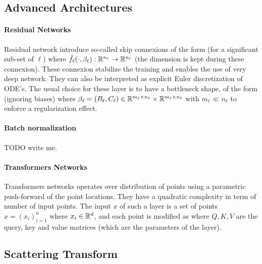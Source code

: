 \subsection{Advanced Architectures}
\label{sec-advanced}


\paragraph{Residual Networks}

Residual network introduce so-called skip connexions of the form (for a significant sub-set of $\ell$)
where $\tilde f_\ell(\cdot,\beta_\ell) : \mathbb{R}^{n_\ell} \rightarrow \mathbb{R}^{n_\ell}$ (the dimension is kept during these connexion). These connexion stabilize the training and enables the use of very deep network. They can also be interpreted as explicit Euler discretization of ODE's.
%
The usual choice for these layer is to have a bottleneck shape, of the form 
(ignoring biases) where $\beta_\ell = (B_\ell, C_\ell) \in \mathbb{R}^{m_\ell \times n_\ell} \times \mathbb{R}^{m_\ell \times n_\ell}$ with $m_\ell \ll n_\ell$ to enforce a regularization effect. 


\paragraph{Batch normalization}

TODO write me.

\paragraph{Transformers Networks}

Transformers networks operates over distribution of points using a parametric push-forward of the point locations. They have a quadratic complexity in term of number of input points. 
%
The input $x$ of such a layer is a set of points $x = (x_i)_{i=1}^n$ where $x_i \in \mathbb{R}^d$, and each point is modified as 
where $Q,K,V$ are the query, key and value matrices (which are the parameters of the layer). 

\subsection{Scattering Transform}
\label{sec-scattering}

